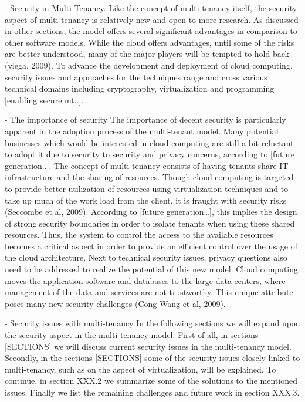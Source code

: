 - Security in Multi-Tenancy.
Like the concept of multi-tenancy itself, the security aspect of multi-tenancy is relatively new and open to more research. As discussed in other sections, the model offers several significant advantages in comparison to other software models. While the cloud offers advantages, until some of the risks are better understood, many of the major players will be tempted to hold back (viega, 2009). To advance the development and deployment of cloud computing, security issues and approaches for the techniques range and cross various technical domains including cryptography, virtualization and programming [enabling secure mt..].

- The importance of security
The importance of decent security is particularly apparent in the adoption process of the multi-tenant model. Many potential businesses which would be interested in cloud computing are still a bit reluctant to adopt it due to security to security and privacy concerns, according to [future generation..]. The concept of multi-tenancy consists of having tenants share IT infrastructure and the sharing of resources. Though cloud computing is targeted to provide better utilization of resources using virtualization techniques and to take up much of the work load from the client, it is fraught with security risks (Seccombe et al, 2009). According to [future generation…], this implies the design of strong security boundaries in order to isolate tenants when using these shared resources. Thus, the system to control the access to the available resources becomes a critical aspect in order to provide an efficient control over the usage of the cloud architecture. 
Next to technical security issues, privacy questions also need to be addressed to realize the potential of this new model. Cloud computing moves the application software and databases to the large data centers, where management of the data and services are not trustworthy. This unique attribute poses many new security challenges (Cong Wang et al, 2009). 

- Security issues with multi-tenancy
In the following sections we will expand upon the security aspect in the multi-tenancy model. First of all, in sections [SECTIONS] we will discuss current security issues in the multi-tenancy model. 
Secondly, in the sections [SECTIONS] some of the security issues closely linked to multi-tenancy, such as on the aspect of virtualization, will be explained. To continue, in section XXX.2 we summarize some of the solutions to the mentioned issues. Finally we list the remaining challenges and future work in section XXX.3.

